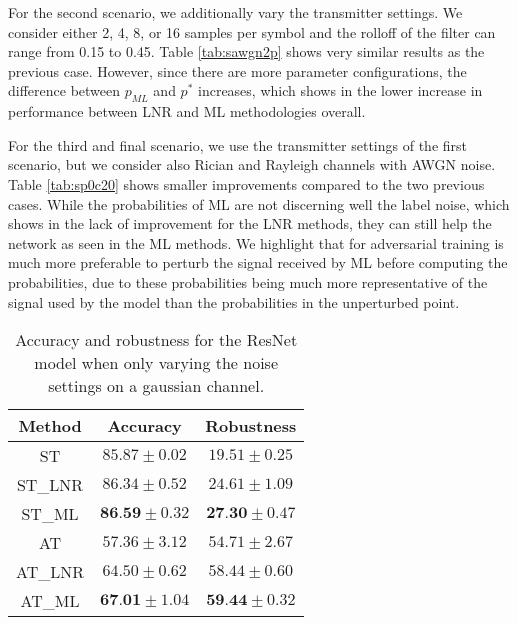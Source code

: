 \documentclass[conference]{IEEEtran}
\begin{document}
For the second scenario, we additionally vary the transmitter settings. We consider either 2, 4, 8, or 16 samples per symbol and the rolloff of the filter can range from 0.15 to 0.45. Table \ref{tab:sawgn2p} shows very similar results as the previous case. However, since there are more parameter configurations, the difference between $p_{ML}$ and $p^{*}$ increases, which shows in the lower increase in performance between LNR and ML methodologies overall.

For the third and final scenario, we use the transmitter settings of the first scenario, but we consider also Rician and Rayleigh channels with AWGN noise. Table \ref{tab:sp0c20} shows smaller improvements compared to the two previous cases. While the probabilities of ML are not discerning well the label noise, which shows in the lack of improvement for the LNR methods, they can still help the network as seen in the ML methods. We highlight that for adversarial training is much more preferable to perturb the signal received by ML before computing the probabilities, due to these probabilities being much more representative of the signal used by the model than the probabilities in the unperturbed point.

\begin{table}[htbp]
	\centering
	\begin{tabular}{c|cc}
	    Method & Accuracy & Robustness \\
		\hline
		ST & $85.87 \pm 0.02$ & $19.51 \pm 0.25$ \\ 
		ST\_LNR & $86.34 \pm 0.52$ & $24.61 \pm 1.09$ \\ 
		ST\_ML & $\textbf{86.59} \pm 0.32$ & $\textbf{27.30} \pm 0.47$ \\ 
		\hline
		AT & $57.36 \pm 3.12$ & $54.71 \pm 2.67$ \\ 
		AT\_LNR & $64.50 \pm 0.62$ & $58.44 \pm 0.60$ \\ 
		AT\_ML & $\textbf{67.01} \pm 1.04$ & $\textbf{59.44} \pm 0.32$ \\ 
    \end{tabular}
    \caption{Accuracy and robustness for the ResNet model when only varying the noise settings on a gaussian channel.}
    \label{tab:sbasic}
\end{table}
\end{document}

